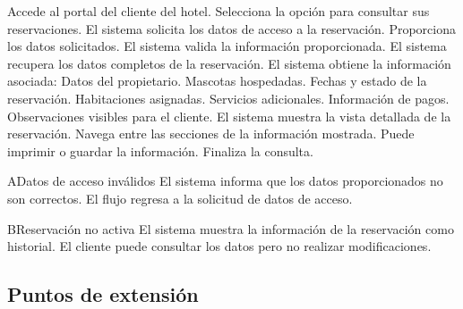 \begin{UCtrayectoria}
	\UCpaso[\UCactor] Accede al portal del cliente del hotel.
	\UCpaso[\UCactor] Selecciona la opción para consultar sus reservaciones.
	\UCpaso El sistema solicita los datos de acceso a la reservación.
	\UCpaso[\UCactor] Proporciona los datos solicitados.
	\UCpaso El sistema valida la información proporcionada.
	\UCpaso El sistema recupera los datos completos de la reservación.
	\UCpaso El sistema obtiene la información asociada:
	\UCpaso[ ] Datos del propietario.
	\UCpaso[ ] Mascotas hospedadas.
	\UCpaso[ ] Fechas y estado de la reservación.
	\UCpaso[ ] Habitaciones asignadas.
	\UCpaso[ ] Servicios adicionales.
	\UCpaso[ ] Información de pagos.
	\UCpaso[ ] Observaciones visibles para el cliente.
	\UCpaso El sistema muestra la vista detallada de la reservación.
	\UCpaso[\UCactor] Navega entre las secciones de la información mostrada.
	\UCpaso[\UCactor] Puede imprimir o guardar la información.
	\UCpaso[\UCactor] Finaliza la consulta.
\end{UCtrayectoria}

\begin{UCtrayectoriaA}{A}{Datos de acceso inválidos}
	\UCpaso El sistema informa que los datos proporcionados no son correctos.
	\UCpaso El flujo regresa a la solicitud de datos de acceso.
\end{UCtrayectoriaA}

\begin{UCtrayectoriaA}{B}{Reservación no activa}
	\UCpaso El sistema muestra la información de la reservación como historial.
	\UCpaso El cliente puede consultar los datos pero no realizar modificaciones.
\end{UCtrayectoriaA}

\subsection{Puntos de extensión}

